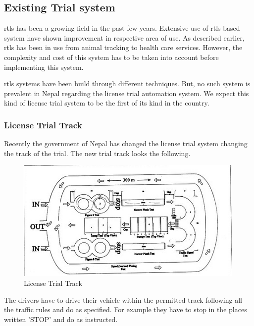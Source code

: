 \subsection{Existing Trial system}
		\gls{rtls} has been a growing field in the past few years. Extensive use of \gls{rtls} based system have shown improvement in respective area of use. As described earlier, \gls{rtls} has been in use from animal tracking to health care services. However, the complexity and cost of this system has to be taken into account before implementing this system.

		\gls{rtls} systems have been build through different techniques. But, no such system is prevalent in Nepal regarding the license trial automation system. We expect this kind of license trial system to be the first of its kind in the country.

	\subsubsection{License Trial Track}
		Recently the government of Nepal has changed the license trial system changing the track of the trial. The new trial track looks the following.
			\begin{figure}[htpb]
				\centering
				\includegraphics[scale=.75]{Images/TrialTrack.png}
				\caption{License Trial Track}
				\label{fig:LicenceTrialTrack}
			\end{figure}
		The drivers have to drive their vehicle within the permitted track following all the traffic rules and do as specified. For example they have to stop in the places written 'STOP' and do as instructed.
		
